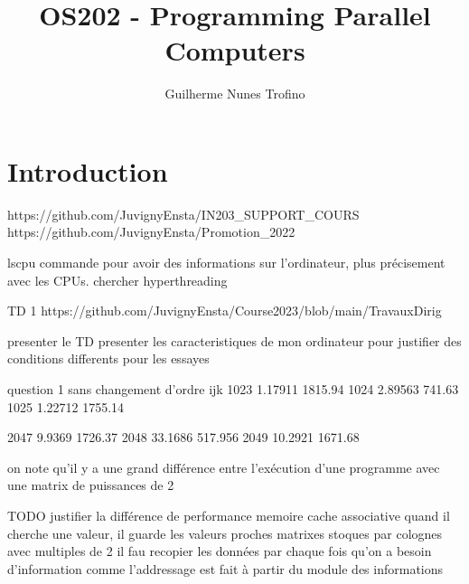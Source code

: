 \documentclass{article}
\title{OS202 - Programming Parallel Computers}
\author{Guilherme Nunes Trofino}
\begin{document}
\maketitle
\setlength{\parindent}{0pt}

\newcommand{\tableN}[3]{
    \begin{table}[H]
        \centering\begin{tabular}{lrl}
            n & secondes & MFloops\\
            \hline\hline
            #2
            \hline
            #3
            \hline
        \end{tabular}
        \caption{ordre \texttt{#1}}
    \end{table}
}



\newpage\tableofcontents

\section{Introduction}
% 
% 

% 

https://github.com/JuvignyEnsta/IN203_SUPPORT_COURS
https://github.com/JuvignyEnsta/Promotion_2022

lscpu commande pour avoir des informations sur l'ordinateur, plus précisement avec les CPUs.
chercher hyperthreading

TD 1
https://github.com/JuvignyEnsta/Course2023/blob/main/TravauxDirig%

presenter le TD
presenter les caracteristiques de mon ordinateur pour justifier des conditions differents pour les essayes

question 1
    sans changement d'ordre ijk
        1023 1.17911 1815.94
        1024 2.89563  741.63
        1025 1.22712 1755.14

        2047  9.9369 1726.37
        2048 33.1686 517.956
        2049 10.2921 1671.68

    on note qu'il y a une grand différence entre l'exécution d'une programme avec une matrix de puissances de 2

    TODO justifier la différence de performance
        memoire cache associative
        quand il cherche une valeur, il guarde les valeurs proches
        matrixes stoques par colognes
        avec multiples de 2 il fau recopier les données par chaque fois qu'on a besoin d'information
        comme l'addressage est fait à partir du module des informations 
\end{document}
